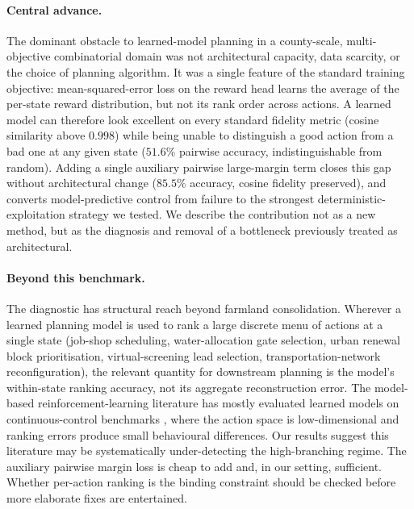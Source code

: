 \documentclass[11pt]{article}
\begin{document}
\paragraph{Central advance.} The dominant obstacle to learned-model planning in a county-scale, multi-objective combinatorial domain was not architectural capacity, data scarcity, or the choice of planning algorithm. It was a single feature of the standard training objective: mean-squared-error loss on the reward head learns the average of the per-state reward distribution, but not its rank order across actions. A learned model can therefore look excellent on every standard fidelity metric (cosine similarity above $0.998$) while being unable to distinguish a good action from a bad one at any given state ($51.6\%$ pairwise accuracy, indistinguishable from random). Adding a single auxiliary pairwise large-margin term closes this gap without architectural change ($85.5\%$ accuracy, cosine fidelity preserved), and converts model-predictive control from failure to the strongest deterministic-exploitation strategy we tested. We describe the contribution not as a new method, but as the diagnosis and removal of a bottleneck previously treated as architectural.

\paragraph{Beyond this benchmark.} The diagnostic has structural reach beyond farmland consolidation. Wherever a learned planning model is used to rank a large discrete menu of actions at a single state (job-shop scheduling, water-allocation gate selection, urban renewal block prioritisation, virtual-screening lead selection, transportation-network reconfiguration), the relevant quantity for downstream planning is the model's within-state ranking accuracy, not its aggregate reconstruction error. The model-based reinforcement-learning literature has mostly evaluated learned models on continuous-control benchmarks \citep{hafner2025dreamerv3,hansen2024tdmpc2,chua2018deep}, where the action space is low-dimensional and ranking errors produce small behavioural differences. Our results suggest this literature may be systematically under-detecting the high-branching regime. The auxiliary pairwise margin loss is cheap to add and, in our setting, sufficient. Whether per-action ranking is the binding constraint should be checked before more elaborate fixes are entertained.
\end{document}
